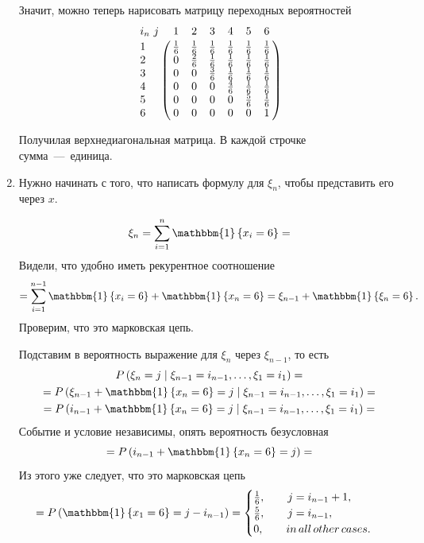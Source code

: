 \begin{enumerate}[label=\alph*)]
  Значит, можно теперь нарисовать матрицу переходных вероятностей
  \begin{equation*}
    \bordermatrix{i_n \ j & 1 & 2 & 3 & 4 & 5 & 6 \cr
                  1 & \frac{1}{6} & \frac{1}{6} & \frac{1}{6} & \frac{1}{6} & \frac{1}{6} & \frac{1}{6}\cr
                  2 & 0 & \frac{2}{6} & \frac{1}{6} & \frac{1}{6} & \frac{1}{6} & \frac{1}{6} \cr
                  3 & 0 & 0 & \frac{3}{6} & \frac{1}{6} & \frac{1}{6} & \frac{1}{6} \cr
                  4 & 0 & 0 & 0 & \frac{4}{6} & \frac{1}{6} & \frac{1}{6} \cr
                  5 & 0 & 0 & 0 & 0 & \frac{5}{6} & \frac{1}{6} \cr
                  6 & 0 & 0 & 0 & 0 & 0 & 1 \cr}
  \end{equation*}

  Получилая верхнедиагональная матрица.
  В каждой строчке сумма~---~единица.
  \item Нужно начинать с того, что написать формулу для $ \xi_n$, чтобы представить его через $x$.

  \begin{equation*}
    \xi_n =
    \sum \limits_{i = 1}^n \mathbbm{1} \left\{ x_i = 6 \right\} =
  \end{equation*}
  Видели, что удобно иметь рекурентное соотношение
  \begin{equation*}
    = \sum \limits_{i = 1}^{n - 1} \mathbbm{1} \left\{ x_i = 6 \right\} +
    \mathbbm{1} \left\{ x_n = 6 \right\} =
    \xi_{n - 1} + \mathbbm{1} \left\{ \xi_n = 6 \right\}.
  \end{equation*}
  Проверим, что это марковская цепь.

  Подставим в вероятность выражение для $ \xi_n$ через $ \xi_{n - 1}$, то есть
  \begin{gather*}
    P \left( \xi_n = j \; \middle| \; \xi_{n - 1} = i_{n - 1}, \dotsc, \xi_1 = i_1 \right) = \\
    = P \left(
      \xi_{n - 1} + \mathbbm{1} \left\{ x_n = 6 \right\} = j \; \middle| \;
      \xi_{n - 1} = i_{n - 1}, \dotsc, \xi_1 = i_1
    \right) = \\
    = P \left(
      i_{n - 1} + \mathbbm{1} \left\{ x_n = 6 \right\} = j  \; \middle| \;
      \xi_{n - 1} = i_{n - 1}, \dotsc, \xi_1 = i_1
    \right) =
  \end{gather*}
  Событие и условие независимы, опять вероятность безусловная
  \begin{equation*}
    = P \left( i_{n - 1} + \mathbbm{1} \left\{ x_n = 6 \right\} = j \right) =
  \end{equation*}
  Из этого уже следует, что это марковская цепь
  \begin{equation*}
    = P \left( \mathbbm{1} \left\{ x_1 = 6 \right\} = j - i_{n - 1} \right) =
    \begin{cases}
      \frac{1}{6}, \qquad j = i_{n - 1} + 1, \\
      \frac{5}{6}, \qquad j = i_{n - 1}, \\
      0, \qquad in \, all \, other \, cases.
    \end{cases}
  \end{equation*}


\end{enumerate}
